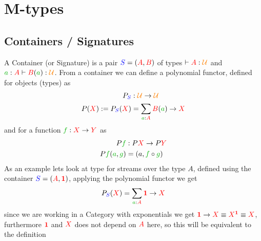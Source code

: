 \documentclass[twoside,11pt,openright]{report}
\newcommand*{\term}[1]{\textcolor{green!70!black}{#1}}
\newcommand*{\type}[1]{\textcolor{red}{#1}}
\newcommand*{\container}[1]{\textcolor{blue}{#1}}
\newcommand*{\universe}[1]{\textcolor{orange}{#1}}
\newcommand*{\unit}{\type{\textbf{1}}}
\begin{document}



\chapter{M-types}
\label{ch:m-types}

\section{Containers / Signatures}
A Container (or Signature) is a pair \(\container{S} = (\type{A},\type{B})\) of types \(\vdash \type{A} : \universe{\mathcal{U}}\) and \(\term{a} : \type{A} \vdash \type{B}(\term{a}) : \universe{\mathcal{U}}\). From a container we can define a polynomial functor, defined for objects (types) as
\begin{equation}
  \begin{aligned}
    P_{\container{S}} &: \universe{\mathcal{U}} \rightarrow \universe{\mathcal{U}} \\
    P(\type{X}) := P_{\container{S}}(\type{X}) &= \sum_{\term{a} : \type{A}} \type{B}(\term{a}) \rightarrow \type{X}
  \end{aligned}
\end{equation}
and for a function \(\term{f} : \type{X} \rightarrow \type{Y}\) as
\begin{equation}
  \begin{aligned}
    P\term{f} &: P\type{X} \rightarrow P\type{Y} \\
    P\term{f}(\term{a},\term{g}) &= (a, \term{f} \circ \term{g})
  \end{aligned}
\end{equation}
As an example lets look at type for streams over the type \(A\), defined using the container \(\container{S} = (\type{A},\unit)\), applying the polynomial functor we get
\begin{equation}
  P_{\container{S}}(\type{X}) = \sum_{\term{a} : \type{A}} \unit \rightarrow \type{X}
\end{equation}
since we are working in a Category with exponentials we get \(\unit \rightarrow \type{X} \equiv \type{X}^{\unit} \equiv \type{X}\), furthermore \(\unit\) and \(\type{X}\) does not depend on \(\type{A}\) here, so this will be equivalent to the definition
\end{document}
